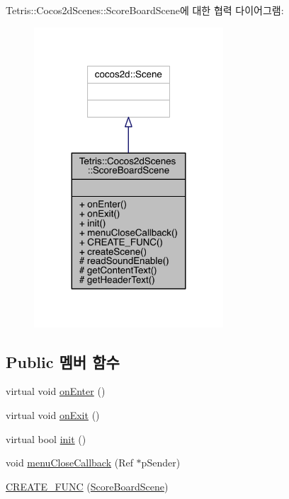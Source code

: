 Tetris\+:\+:Cocos2d\+Scenes\+:\+:Score\+Board\+Scene에 대한 협력 다이어그램\+:
\nopagebreak
\begin{figure}[H]
\begin{center}
\leavevmode
\includegraphics[width=200pt]{class_tetris_1_1_cocos2d_scenes_1_1_score_board_scene__coll__graph}
\end{center}
\end{figure}
\subsection*{Public 멤버 함수}
\begin{DoxyCompactItemize}
\item 
virtual void \hyperlink{class_tetris_1_1_cocos2d_scenes_1_1_score_board_scene_a667d5d9ca7709281c7b67814e5495a26}{on\+Enter} ()
\item 
virtual void \hyperlink{class_tetris_1_1_cocos2d_scenes_1_1_score_board_scene_ade9d785bcda22a7d410c316909377ff8}{on\+Exit} ()
\item 
virtual bool \hyperlink{class_tetris_1_1_cocos2d_scenes_1_1_score_board_scene_a348c50d4213a4fee3888c216c16712ef}{init} ()
\item 
void \hyperlink{class_tetris_1_1_cocos2d_scenes_1_1_score_board_scene_ad17f53b26718969718fed03b2b38ff61}{menu\+Close\+Callback} (Ref $\ast$p\+Sender)
\item 
\hyperlink{class_tetris_1_1_cocos2d_scenes_1_1_score_board_scene_afe728259a0507c6fdec598ef5334a3a5}{C\+R\+E\+A\+T\+E\+\_\+\+F\+U\+NC} (\hyperlink{class_tetris_1_1_cocos2d_scenes_1_1_score_board_scene}{Score\+Board\+Scene})
\end{DoxyCompactItemize}
